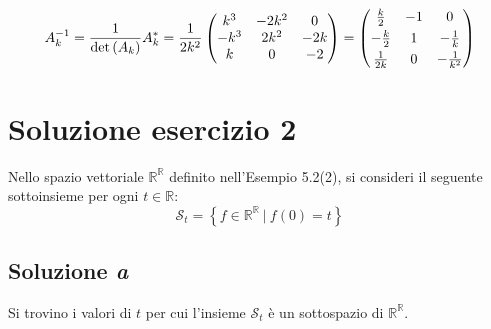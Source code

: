 \documentclass[a4paper]{article}
\makeatletter
\newenvironment{rowequmat}[1]{\left(\array{@{}#1@{}}}{\endarray\right)}
\makeatother
\begin{document}
	\begin{equation*}
		A_{k}^{-1} = \dfrac{1}{\det\left(A_{k}\right)} A_{k}^{*} = \dfrac{1}{2k^{2}} \begin{pmatrix}
			k^{3} 	& -2k^{2} 	& 0 \\
			-k^{3}	& 2k^{2}	& -2k \\
			k		& 0			& -2
		\end{pmatrix} = \begin{rowequmat}{ccc}
			\frac{k}{2}		& -1	&	0 			\\ [0.3em]
			-\frac{k}{2}	& 1		& -\frac{1}{k} 	\\ [0.3em]
			\frac{1}{2k}	& 0		& -\frac{1}{k^{2}}
		\end{rowequmat}
	\end{equation*}\newpage
	
	\section{Soluzione esercizio 2}
	
	Nello spazio vettoriale $\mathbb{R^{R}}$ definito nell'Esempio 5.2(2), si consideri il seguente sottoinsieme per ogni $t \in \mathbb{R}$:
	\begin{equation*}
		\mathscr{S}_{t} = \left\{f \in \mathbb{R^{R}} \: | \: f\left(0\right) = t\right\}
	\end{equation*}
	
	\subsection{Soluzione \emph{a}}
	
	Si trovino i valori di $t$ per cui l'insieme $\mathscr{S}_{t}$ è un sottospazio di $\mathbb{R^{R}}$.\newline
	
\end{document}
